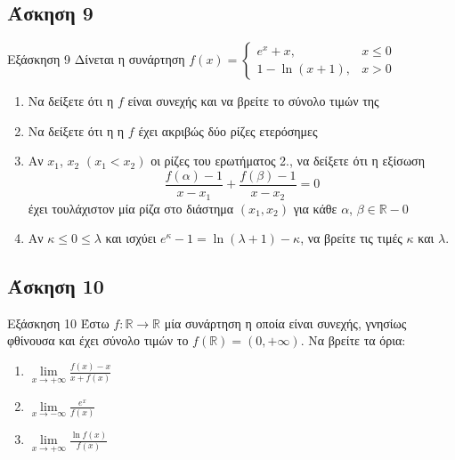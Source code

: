 \documentclass[greek]{beamer}
\begin{document}
\subsection{Άσκηση 9}
\begin{frame}{Εξάσκηση 9}
 Δίνεται η συνάρτηση $f(x)=\begin{cases}
   e^x+x,       & x\le 0 \\
   1-\ln (x+1), & x>0
  \end{cases}$
 \begin{enumerate}
  \item<1-> Να δείξετε ότι η $f$ είναι συνεχής και να βρείτε το σύνολο τιμών της
  \item<2-> Να δείξετε ότι η η $f$ έχει ακριβώς δύο ρίζες ετερόσημες
  \item<3-> Αν $x_1$, $x_2$ $(x_1<x_2)$ οι ρίζες του ερωτήματος 2., να δείξετε ότι η εξίσωση
        $$\frac{f(α)-1}{x-x_1}+\frac{f(β)-1}{x-x_2}=0$$
        έχει τουλάχιστον μία ρίζα στο διάστημα $(x_1,x_2)$ για κάθε $α$, $β\in\mathbb{R}-{0}$
  \item<4-> Αν $κ\le 0\le λ$ και ισχύει $e^κ-1=\ln (λ+1)-κ$, να βρείτε τις τιμές $κ$ και $λ$.
 \end{enumerate}
\end{frame}

\subsection{Άσκηση 10}
\begin{frame}{Εξάσκηση 10}
 Έστω $f:\mathbb{R}\to\mathbb{R}$ μία συνάρτηση η οποία είναι συνεχής, γνησίως φθίνουσα και έχει σύνολο τιμών το $f(\mathbb{R})=(0,+\infty)$. Να βρείτε τα όρια:
 \begin{enumerate}
  \item<1-> $\lim\limits_{x \to +\infty}{ \frac{f(x)-x}{x+f(x)} }$
  \item<2-> $\lim\limits_{x \to -\infty}{ \frac{e^x}{f(x)} }$
  \item<3-> $\lim\limits_{x \to +\infty}{ \frac{\ln f(x)}{f(x)} }$
 \end{enumerate}
\end{frame}
\end{document}
